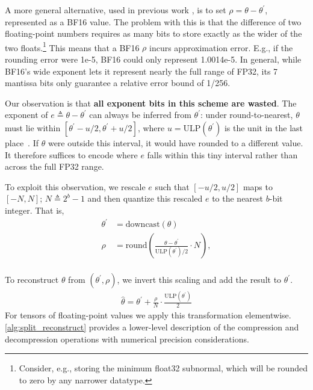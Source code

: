 \documentclass[10pt,twocolumn,letterpaper]{article}
\theoremstyle{plain}
\theoremstyle{definition}
\theoremstyle{remark}
\newcommand{\thetalp}{\theta^\prime}
\begin{document}
A more general alternative, used in previous work \citep{zamirai2020revisiting,warner2024optimi}, is to set $\rho = \theta - \thetalp$, represented as a BF16 value. The problem with this is that the difference of two floating-point numbers requires as many bits to store exactly as the wider of the two floats.\footnote{Consider, e.g., storing the minimum float32 subnormal, which will be rounded to zero by any narrower datatype.} This means that a BF16 $\rho$ incurs approximation error. E.g., if the rounding error were 1e-5, BF16 could only represent 1.0014e-5. In general, while BF16's wide exponent lets it represent nearly the full range of FP32, its 7 mantissa bits only guarantee a relative error bound of 1/256.  

Our observation is that \textbf{all exponent bits in this scheme are wasted}. 
The exponent of $e \triangleq \theta - \thetalp$ can always be inferred from 
$\thetalp$: under round-to-nearest, $\theta$ must lie within 
$[\thetalp - u/2, \thetalp + u/2]$, where $u = \text{ULP}(\thetalp)$ is the 
unit in the last place~\citep{goldberg1991every}. If $\theta$ were outside 
this interval, it would have rounded to a different value. It therefore 
suffices to encode where $e$ falls within this tiny interval rather than 
across the full FP32 range.

To exploit this observation, we rescale $e$ such that $[-u/2, u/2]$ maps to $[-N, N]$; $N \triangleq 2^b -1$ and then quantize this rescaled $e$ to the nearest $b$-bit integer. That is,
\begin{equation}
\begin{aligned}
    \thetalp &= \text{downcast}(\theta) \\
    \rho &= \text{round}\left( \frac{\theta - \thetalp}{\text{ULP}(\thetalp)/2}\cdot N \right), \\
\end{aligned}
\label{eq:compress}
\end{equation}

To reconstruct $\theta$ from $(\thetalp, \rho)$, we invert this scaling and add the result to $\thetalp$. 
\begin{equation}
\begin{aligned}
\hat{\theta} =    \thetalp + \frac{\rho}{N} \cdot \frac{\text{ULP}(\thetalp)}{2}
\end{aligned}
\label{eq:decompress}
\end{equation}
For tensors of floating-point values we apply this transformation elementwise.
\autoref{alg:split_reconstruct} provides a lower-level description of the compression and decompression operations with numerical precision considerations.
\end{document}
